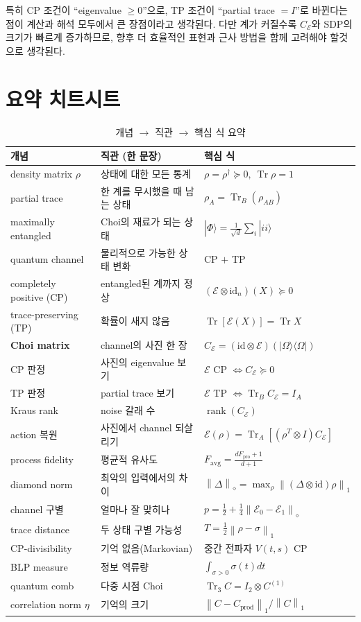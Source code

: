 \documentclass[11pt,a4paper]{article}
\newcommand{\E}{\mathcal{E}}
\newcommand{\Tr}{\operatorname{Tr}}
\newcommand{\id}{\mathrm{id}}
\newcommand{\diamondnorm}[1]{\left\lVert #1 \right\rVert_{\diamond}}
\newcommand{\onenorm}[1]{\left\lVert #1 \right\rVert_{1}}
\newcommand{\rank}{\operatorname{rank}}
\theoremstyle{definition}
\theoremstyle{plain}
\theoremstyle{remark}
\begin{document}
특히 CP 조건이 ``eigenvalue $\ge0$''으로, TP 조건이 ``partial trace $=I$''로 바뀐다는 점이 계산과 해석 모두에서 큰 장점이라고 생각된다. 다만 계가 커질수록 $C_\E$와 SDP의 크기가 빠르게 증가하므로, 향후 더 효율적인 표현과 근사 방법을 함께 고려해야 할것으로 생각된다.

\appendix
\section{요약 치트시트}

\begin{longtable}{p{}p{}p{}}
\caption{개념 $\to$ 직관 $\to$ 핵심 식 요약}\\
\toprule
개념 & 직관 (한 문장) & 핵심 식 \\
\midrule
\endhead
density matrix $\rho$ & 상태에 대한 모든 통계 & $\rho=\rho^\dagger\succeq0,\ \Tr\rho=1$ \\
partial trace & 한 계를 무시했을 때 남는 상태 & $\rho_A=\Tr_B(\rho_{AB})$ \\
maximally entangled & Choi의 재료가 되는 상태 & $|\Phi\rangle=\tfrac1{\sqrt d}\sum_i|ii\rangle$ \\
quantum channel & 물리적으로 가능한 상태 변화 & CP $+$ TP \\
completely positive (CP) & entangled된 계까지 정상 & $(\E\otimes\id_n)(X)\succeq0$ \\
trace-preserving (TP) & 확률이 새지 않음 & $\Tr[\E(X)]=\Tr X$ \\
\textbf{Choi matrix} & channel의 사진 한 장 & $C_\E=(\id\otimes\E)(|\Omega\rangle\langle\Omega|)$ \\
CP 판정 & 사진의 eigenvalue 보기 & $\E$ CP $\iff C_\E\succeq0$ \\
TP 판정 & partial trace 보기 & $\E$ TP $\iff\Tr_B C_\E=I_A$ \\
Kraus rank & noise 갈래 수 & $\rank(C_\E)$ \\
action 복원 & 사진에서 channel 되살리기 & $\E(\rho)=\Tr_A[(\rho^T\otimes I)C_\E]$ \\
process fidelity & 평균적 유사도 & $F_{\mathrm{avg}}=\frac{dF_{\mathrm{pro}}+1}{d+1}$ \\
diamond norm & 최악의 입력에서의 차이 & $\diamondnorm{\Delta}=\max_\rho\onenorm{(\Delta\otimes\id)\rho}$ \\
channel 구별 & 얼마나 잘 맞히나 & $p=\tfrac12+\tfrac14\diamondnorm{\E_0-\E_1}$ \\
trace distance & 두 상태 구별 가능성 & $T=\tfrac12\onenorm{\rho-\sigma}$ \\
CP-divisibility & 기억 없음(Markovian) & 중간 전파자 $V(t,s)$ CP \\
BLP measure & 정보 역류량 & $\int_{\sigma>0}\sigma(t)dt$ \\
quantum comb & 다중 시점 Choi & $\Tr_3 C=I_2\otimes C^{(1)}$ \\
correlation norm $\eta$ & 기억의 크기 & $\onenorm{C-C_{\mathrm{prod}}}/\onenorm{C}$ \\
\bottomrule
\end{longtable}
\end{document}
